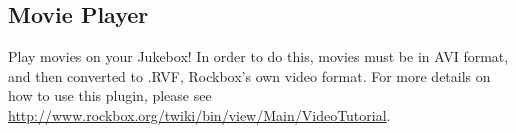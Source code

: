\subsection{Movie Player}
Play movies on your Jukebox!  In order to do
this, movies must be in AVI format, and then converted to .RVF,
Rockbox's own video format.  For more details on how to use this plugin, please see \url{http://www.rockbox.org/twiki/bin/view/Main/VideoTutorial}.


